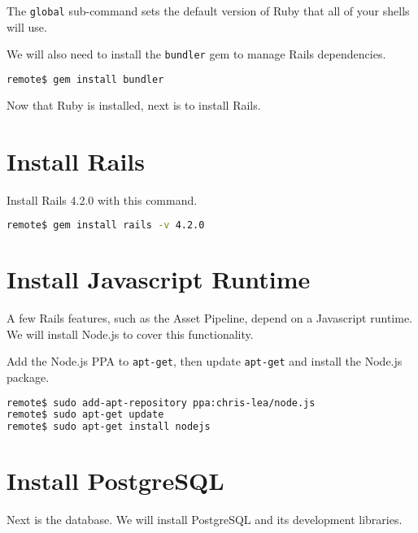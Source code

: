 The \texttt{global} sub-command sets the default version of Ruby
that all of your shells will use.

We will also need to install the \texttt{bundler} gem
to manage Rails dependencies.

\begin{minipage}{\linewidth}
\begin{lstlisting}[language=bash]
remote$ gem install bundler
\end{lstlisting}
\end{minipage}

Now that Ruby is installed, next is to install Rails.

\section{Install Rails}

Install Rails 4.2.0 with this command.

\begin{minipage}{\linewidth}
\begin{lstlisting}[language=bash]
remote$ gem install rails -v 4.2.0
\end{lstlisting}
\end{minipage}

\section{Install Javascript Runtime}

A few Rails features, such as the Asset Pipeline,
depend on a Javascript runtime. We will install Node.js
to cover this functionality.

Add the Node.js PPA to \texttt{apt-get}, then update \texttt{apt-get}
and install the Node.js package.

\begin{minipage}{\linewidth}
\begin{lstlisting}[language=bash]
remote$ sudo add-apt-repository ppa:chris-lea/node.js
remote$ sudo apt-get update
remote$ sudo apt-get install nodejs
\end{lstlisting}
\end{minipage}

\section{Install PostgreSQL}

Next is the database. We will install PostgreSQL and its development libraries.

